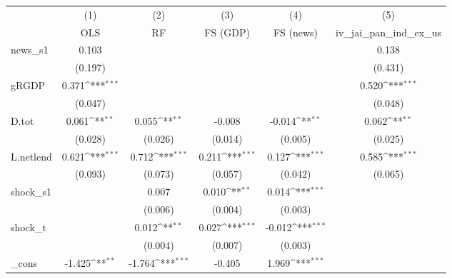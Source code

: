 {
\def\sym#1{\ifmmode^{#1}\else\(^{#1}\)\fi}
\begin{tabular}{l*{5}{c}}
\toprule
            &\multicolumn{1}{c}{(1)}&\multicolumn{1}{c}{(2)}&\multicolumn{1}{c}{(3)}&\multicolumn{1}{c}{(4)}&\multicolumn{1}{c}{(5)}\\
            &\multicolumn{1}{c}{OLS}&\multicolumn{1}{c}{RF}&\multicolumn{1}{c}{FS (GDP)}&\multicolumn{1}{c}{FS (news)}&\multicolumn{1}{c}{iv\_jai\_pan\_ind\_ex\_us}\\
\midrule
news\_s1     &       0.103         &                     &                     &                     &       0.138         \\
            &     (0.197)         &                     &                     &                     &     (0.431)         \\
\addlinespace
gRGDP       &       0.371\sym{***}&                     &                     &                     &       0.520\sym{***}\\
            &     (0.047)         &                     &                     &                     &     (0.048)         \\
\addlinespace
D.tot       &       0.061\sym{**} &       0.055\sym{**} &      -0.008         &      -0.014\sym{**} &       0.062\sym{**} \\
            &     (0.028)         &     (0.026)         &     (0.014)         &     (0.005)         &     (0.025)         \\
\addlinespace
L.netlend   &       0.621\sym{***}&       0.712\sym{***}&       0.211\sym{***}&       0.127\sym{***}&       0.585\sym{***}\\
            &     (0.093)         &     (0.073)         &     (0.057)         &     (0.042)         &     (0.065)         \\
\addlinespace
shock\_s1    &                     &       0.007         &       0.010\sym{**} &       0.014\sym{***}&                     \\
            &                     &     (0.006)         &     (0.004)         &     (0.003)         &                     \\
\addlinespace
shock\_t     &                     &       0.012\sym{**} &       0.027\sym{***}&      -0.012\sym{***}&                     \\
            &                     &     (0.004)         &     (0.007)         &     (0.003)         &                     \\
\addlinespace
\_cons      &      -1.425\sym{**} &      -1.764\sym{***}&      -0.405         &       1.969\sym{***}&                     \\

\end{tabular}}
